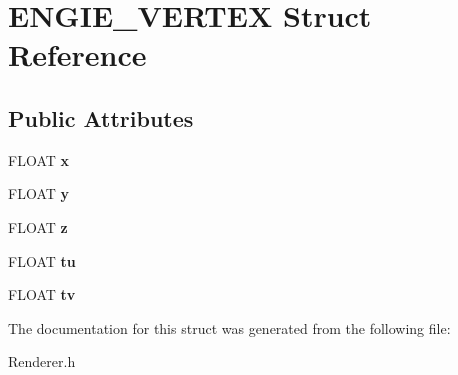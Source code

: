 \hypertarget{struct_e_n_g_i_e___v_e_r_t_e_x}{\section{E\-N\-G\-I\-E\-\_\-\-V\-E\-R\-T\-E\-X Struct Reference}
\label{struct_e_n_g_i_e___v_e_r_t_e_x}
}
\subsection*{Public Attributes}
\begin{DoxyCompactItemize}
\item 
\hypertarget{struct_e_n_g_i_e___v_e_r_t_e_x_a435c2dc7562a197f2ff00e6f5887574e}{F\-L\-O\-A\-T {\bfseries x}}\label{struct_e_n_g_i_e___v_e_r_t_e_x_a435c2dc7562a197f2ff00e6f5887574e}

\item 
\hypertarget{struct_e_n_g_i_e___v_e_r_t_e_x_adeabf084e472c7f64cc0d9250f1f6470}{F\-L\-O\-A\-T {\bfseries y}}\label{struct_e_n_g_i_e___v_e_r_t_e_x_adeabf084e472c7f64cc0d9250f1f6470}

\item 
\hypertarget{struct_e_n_g_i_e___v_e_r_t_e_x_a0847bb638d2734565a9cad5c268afe82}{F\-L\-O\-A\-T {\bfseries z}}\label{struct_e_n_g_i_e___v_e_r_t_e_x_a0847bb638d2734565a9cad5c268afe82}

\item 
\hypertarget{struct_e_n_g_i_e___v_e_r_t_e_x_a789127a0b4667146a91eb57c2ad1994f}{F\-L\-O\-A\-T {\bfseries tu}}\label{struct_e_n_g_i_e___v_e_r_t_e_x_a789127a0b4667146a91eb57c2ad1994f}

\item 
\hypertarget{struct_e_n_g_i_e___v_e_r_t_e_x_a3d918e05f43017a1bdd3af89391afe3e}{F\-L\-O\-A\-T {\bfseries tv}}\label{struct_e_n_g_i_e___v_e_r_t_e_x_a3d918e05f43017a1bdd3af89391afe3e}

\end{DoxyCompactItemize}


The documentation for this struct was generated from the following file\-:\begin{DoxyCompactItemize}
\item 
Renderer.\-h\end{DoxyCompactItemize}
